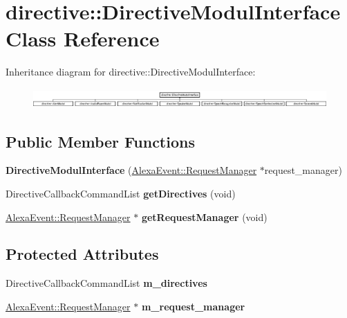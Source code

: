 \hypertarget{classdirective_1_1DirectiveModulInterface}{}\section{directive\+:\+:Directive\+Modul\+Interface Class Reference}
\label{classdirective_1_1DirectiveModulInterface}
Inheritance diagram for directive\+:\+:Directive\+Modul\+Interface\+:\begin{figure}[H]
\begin{center}
\leavevmode
\includegraphics[height=0.730594cm]{df/d50/classdirective_1_1DirectiveModulInterface}
\end{center}
\end{figure}
\subsection*{Public Member Functions}
\begin{DoxyCompactItemize}
\item 
\mbox{\label{classdirective_1_1DirectiveModulInterface_a56612b905bb0304846354b56ddd76d3b}} 
{\bfseries Directive\+Modul\+Interface} (\hyperlink{classAlexaEvent_1_1RequestManager}{Alexa\+Event\+::\+Request\+Manager} $\ast$request\+\_\+manager)
\item 
\mbox{\label{classdirective_1_1DirectiveModulInterface_a8b02bee035fd28bbbfd06154ec53ff4f}} 
Directive\+Callback\+Command\+List {\bfseries get\+Directives} (void)
\item 
\mbox{\label{classdirective_1_1DirectiveModulInterface_a3b943d2ca94671aec1ff99ba1f2fd5b0}} 
\hyperlink{classAlexaEvent_1_1RequestManager}{Alexa\+Event\+::\+Request\+Manager} $\ast$ {\bfseries get\+Request\+Manager} (void)
\end{DoxyCompactItemize}
\subsection*{Protected Attributes}
\begin{DoxyCompactItemize}
\item 
\mbox{\label{classdirective_1_1DirectiveModulInterface_a7a01db71ceeb487341b5f78594dbfbcc}} 
Directive\+Callback\+Command\+List {\bfseries m\+\_\+directives}
\item 
\mbox{\label{classdirective_1_1DirectiveModulInterface_a8077a356e0238bb10b0b2bf6f0c88080}} 
\hyperlink{classAlexaEvent_1_1RequestManager}{Alexa\+Event\+::\+Request\+Manager} $\ast$ {\bfseries m\+\_\+request\+\_\+manager}
\end{DoxyCompactItemize}


